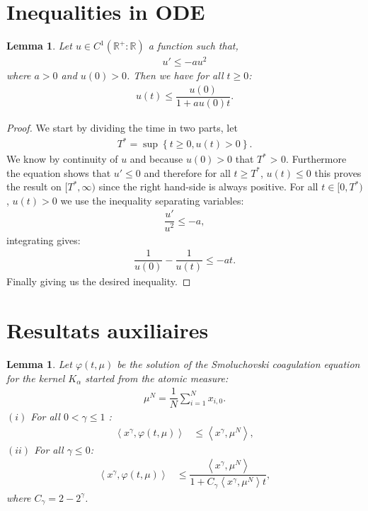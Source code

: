 \documentclass[11pt,a4paper]{article}
\newcommand{\RR}{\mathbb{R}}
\newtheorem{lemma}[theorem]{Lemma}
\begin{document}
\section{Inequalities in ODE}

\begin{lemma}\label{lem:inequality_ODE_square}
    Let $u \in C^1\left(\RR^+ : \RR \right)$ a function such that,
    \begin{align*}
        u' \leq -a u^2
    \end{align*}
    where $a > 0$ and $u(0) > 0$. Then we have for all $t\geq 0$:
    \begin{align*}
        u(t) \leq \dfrac{u(0)}{1 + au(0)t}.
    \end{align*}
\end{lemma}
\begin{proof}
    We start by dividing the time in two parts, let
    \begin{align*}
        T^* = \sup\left\lbrace t \geq 0, u(t) > 0 \right\rbrace.
    \end{align*}
    We know by continuity of $u$ and because $u(0) > 0$ that $T^*$ > 0. Furthermore the equation shows that $u' \leq 0$ and therefore for all $t \geq T^*$, $u(t) \leq 0$ this proves the result on $[T^*,\infty)$ since the right hand-side is always positive. For all $t \in [0,T^*)$, $u(t) > 0$ we use the inequality separating variables:
    \begin{align*}
        \dfrac{u'}{u^2} \leq -a, 
    \end{align*}
    integrating gives:
    \begin{align*}
        \dfrac{1}{u(0)} - \dfrac{1}{u(t)} \leq -at.
    \end{align*}
    Finally giving us the desired inequality.
\end{proof}
\section{Resultats auxiliaires}
\begin{lemma}
    Let $\varphi\left(t,\mu\right)$ be the solution of the Smoluchovski coagulation equation for the kernel $K_\alpha$ started from the atomic measure:
    \begin{align*}
        \mu^N = \dfrac{1}{N}\sum\limits_{i = 1}^N x_{i,0}.
    \end{align*}
    $(i)$ For all $0 < \gamma \leq 1$ :
    \begin{align*}
        \left\langle x^\gamma, \varphi\left(t,\mu\right) \right\rangle &\leq \left\langle x^\gamma, \mu^N \right\rangle,
    \end{align*}
    $(ii)$ For all $\gamma \leq 0$:
    \begin{align*}
        \left\langle x^\gamma, \varphi\left(t,\mu\right) \right\rangle &\leq \dfrac{\left\langle x^\gamma, \mu^N \right\rangle}{1 + C_\gamma\left\langle x^{\gamma}, \mu^N \right\rangle t } ,
    \end{align*}
    where $C_\gamma = 2 - 2^{\gamma}$.
\end{lemma}



\end{document}
